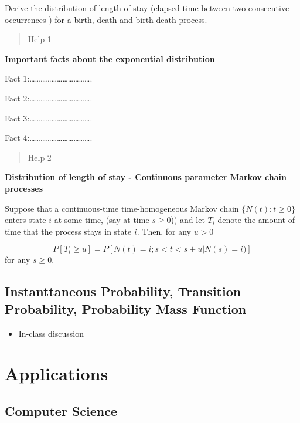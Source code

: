 \documentclass[
  letterpaper,
  DIV=11,
  numbers=noendperiod]{scrreprt}
\providecommand{\tightlist}{%
  \setlength{\itemsep}{0pt}\setlength{\parskip}{0pt}}\usepackage{longtable,booktabs,array}
\begin{document}
Derive the distribution of length of stay (elapsed time between two
consecutive occurrences ) for a birth, death and birth-death process.

\begin{quote}
Help 1
\end{quote}

\textbf{Important facts about the exponential distribution}

Fact
1:\ldots\ldots\ldots\ldots\ldots\ldots\ldots\ldots\ldots\ldots\ldots.

Fact
2:\ldots\ldots\ldots\ldots\ldots\ldots\ldots\ldots\ldots\ldots\ldots.

Fact
3:\ldots\ldots\ldots\ldots\ldots\ldots\ldots\ldots\ldots\ldots\ldots.

Fact
4:\ldots\ldots\ldots\ldots\ldots\ldots\ldots\ldots\ldots\ldots\ldots.

\begin{quote}
Help 2
\end{quote}

\textbf{Distribution of length of stay - Continuous parameter Markov
chain processes}

Suppose that a continuous-time time-homogeneous Markov chain
\(\{N(t): t \geq 0\}\) enters state \(i\) at some time, (say at time
\(s \geq 0\))) and let \(T_i\) denote the amount of time that the
process stays in state \(i\). Then, for any \(u > 0\)

\[P[T_i \geq u] = P[N(t)=i; s < t < s+u|N(s)=i)]\] for any \(s \geq 0\).

\section{Instanttaneous Probability, Transition Probability, Probability
Mass
Function}\label{instanttaneous-probability-transition-probability-probability-mass-function}

\begin{itemize}
\tightlist
\item
  In-class discussion
\end{itemize}


\chapter{Applications}\label{applications-1}

\section{Computer Science}\label{computer-science}
\end{document}
